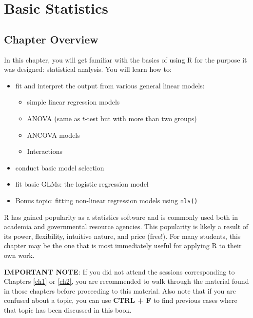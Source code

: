 \documentclass[]{book}
\providecommand{\tightlist}{%
  \setlength{\itemsep}{0pt}\setlength{\parskip}{0pt}}
\begin{document}
\hypertarget{ch3}{%
\chapter{Basic Statistics}\label{ch3}}

\hypertarget{chapter-overview-2}{%
\section*{Chapter Overview}\label{chapter-overview-2}}

In this chapter, you will get familiar with the basics of using R for the purpose it was designed: statistical analysis. You will learn how to:

\begin{itemize}
\tightlist
\item
  fit and interpret the output from various general linear models:

  \begin{itemize}
  \tightlist
  \item
    simple linear regression models
  \item
    ANOVA (same as \(t\)-test but with more than two groups)
  \item
    ANCOVA models
  \item
    Interactions
  \end{itemize}
\item
  conduct basic model selection
\item
  fit basic GLMs: the logistic regression model
\item
  Bonus topic: fitting non-linear regression models using \texttt{nls()}
\end{itemize}

R has gained popularity as a statistics software and is commonly used both in academia and governmental resource agencies. This popularity is likely a result of its power, flexibility, intuitive nature, and price (free!). For many students, this chapter may be the one that is most immediately useful for applying R to their own work.

\textbf{IMPORTANT NOTE}: If you did not attend the sessions corresponding to Chapters \ref{ch1} or \ref{ch2}, you are recommended to walk through the material found in those chapters before proceeding to this material. Also note that if you are confused about a topic, you can use \textbf{CTRL + F} to find previous cases where that topic has been discussed in this book.
\end{document}
